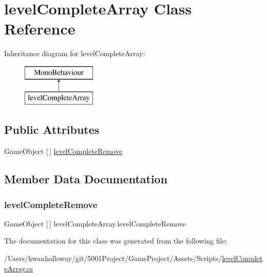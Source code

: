\hypertarget{classlevel_complete_array}{}\section{level\+Complete\+Array Class Reference}
\label{classlevel_complete_array}
Inheritance diagram for level\+Complete\+Array\+:\begin{figure}[H]
\begin{center}
\leavevmode
\includegraphics[height=2.000000cm]{classlevel_complete_array}
\end{center}
\end{figure}
\subsection*{Public Attributes}
\begin{DoxyCompactItemize}
\item 
Game\+Object \mbox{[}$\,$\mbox{]} \hyperlink{classlevel_complete_array_a24b83f2696ca2c65b1412047a618f49b}{level\+Complete\+Remove}
\end{DoxyCompactItemize}


\subsection{Member Data Documentation}
\mbox{\label{classlevel_complete_array_a24b83f2696ca2c65b1412047a618f49b}} 
\subsubsection{\texorpdfstring{level\+Complete\+Remove}{levelCompleteRemove}}
{\footnotesize\ttfamily Game\+Object \mbox{[}$\,$\mbox{]} level\+Complete\+Array.\+level\+Complete\+Remove}



The documentation for this class was generated from the following file\+:\begin{DoxyCompactItemize}
\item 
/\+Users/kwanholloway/git/5001\+Project/\+Game\+Project/\+Assets/\+Scripts/\hyperlink{level_complete_array_8cs}{level\+Complete\+Array.\+cs}\end{DoxyCompactItemize}
